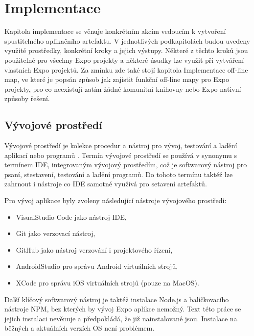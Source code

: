 
\chapter{Implementace}

Kapitola implementace se věnuje konkrétním akcím vedoucím k vytvoření spustitelného aplikačního artefaktu. V jednotlivých podkapitolách budou uvedeny využité prostředky, konkrétní kroky a jejich výstupy. Některé z těchto kroků jsou použitelné pro všechny Expo projekty a některé úsudky lze využit při vytváření vlastních Expo projektů. Za zmínku zde také stojí kapitola Implementace off-line map, ve které je popsán způsob jak zajistit funkční off-line mapy pro Expo projekty, pro co neexistují zatím žádné komunitní knihovny nebo Expo-nativní způsoby řešení.

\section{Vývojové prostředí}


Vývojové prostředí je kolekce procedur a nástroj pro vývoj, testování a ladění aplikací nebo programů \cite{technopediaDevEnv}. Termín vývojové prostředí se používá v synonymu s termínem IDE, integrovaným vývojový prostředím, což je softwarový nástroj pro psaní, stestavení, testování a ladění programů. Do tohoto termínu taktéž lze zahrnout i nástroje co IDE samotné využívá pro setavení artefaktů.

Pro vývoj aplikace byly zvoleny následující nástroje vývojového prostředí:

\begin{itemize}
	\item VisualStudio Code jako nástroj IDE,
	\item Git jako verzovací nástroj,
	\item GitHub jako nástroj verzování i projektového řízení,
	\item AndroidStudio pro správu Android virtuálních strojů,
	\item XCode pro správu iOS virtuálních strojů (pouze na MacOS).
\end{itemize}

Další klíčový softwarový nástroj je taktéž instalace Node.js a balíčkovacího nástroje NPM, bez kterých by vývoj Expo aplikce nemožný. Text této práce se jejich instalaci nevěnuje a předpokládá, že již nainstalované jsou. Instalace na běžných a aktuálních verzích OS není problémem.

